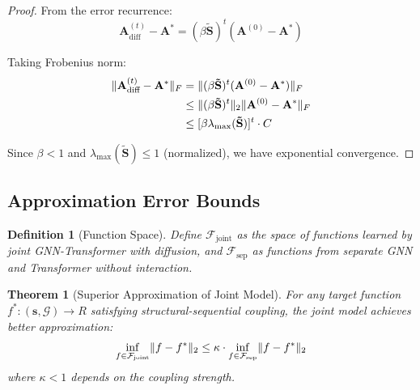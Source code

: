 \documentclass[11pt]{article}
\newtheorem{definition}{Definition}
\newtheorem{theorem}{Theorem}
\newtheorem{proof}{Proof}
\DeclarePairedDelimiter{\norm}{\lVert}{\rVert}
\begin{document}
\begin{proof}
From the error recurrence:
\begin{equation}
    \mathbf{A}_{\text{diff}}^{(t)} - \mathbf{A}^* = (\beta \mathbf{\tilde{S}})^t (\mathbf{A}^{(0)} - \mathbf{A}^*)
\end{equation}

Taking Frobenius norm:
\begin{align}
    \norm{\mathbf{A}_{\text{diff}}^{(t)} - \mathbf{A}^*}_F &= \norm{(\beta \mathbf{\tilde{S}})^t (\mathbf{A}^{(0)} - \mathbf{A}^*)}_F \\
    &\leq \norm{(\beta \mathbf{\tilde{S}})^t}_2 \norm{\mathbf{A}^{(0)} - \mathbf{A}^*}_F \\
    &\leq [\beta \lambda_{\max}(\mathbf{\tilde{S}})]^t \cdot C
\end{align}

Since $\beta < 1$ and $\lambda_{\max}(\mathbf{\tilde{S}}) \leq 1$ (normalized), we have exponential convergence.
\end{proof}

\subsection{Approximation Error Bounds}

\begin{definition}[Function Space]
Define $\mathcal{F}_{\text{joint}}$ as the space of functions learned by joint GNN-Transformer with diffusion, and $\mathcal{F}_{\text{sep}}$ as functions from separate GNN and Transformer without interaction.
\end{definition}

\begin{theorem}[Superior Approximation of Joint Model]
\label{thm:approximation}
For any target function $f^*: (\mathbf{s}, \mathcal{G}) \to R$ satisfying structural-sequential coupling, the joint model achieves better approximation:
\begin{equation}
    \inf_{f \in \mathcal{F}_{\text{joint}}} \norm{f - f^*}_2 \leq \kappa \cdot \inf_{f \in \mathcal{F}_{\text{sep}}} \norm{f - f^*}_2
\end{equation}
where $\kappa < 1$ depends on the coupling strength.
\end{theorem}
\end{document}
